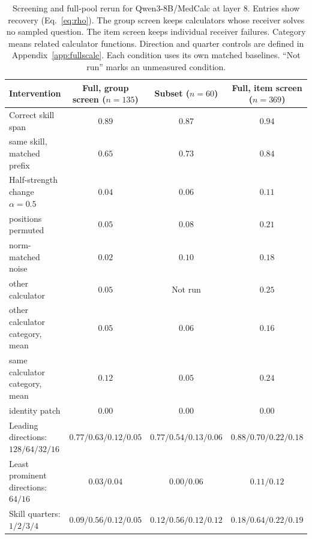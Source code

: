 \begin{table}[tbp]
\caption{Screening and full-pool rerun for Qwen3-8B/MedCalc at layer $8$.
Entries show recovery
(Eq.~\ref{eq:rho}). The group screen keeps calculators whose receiver
solves no sampled question. The item screen keeps individual receiver
failures. Category means related calculator functions. Direction and
quarter controls are defined in Appendix~\ref{app:fullscale}.
Each condition uses its own matched baselines. ``Not run'' marks an
unmeasured condition.}
\label{tab:fullscale}
\centering
\small
\renewcommand{\arraystretch}{1.18}
\begin{tabular}{lccc}
\toprule
Intervention & Full, group screen ($n=135$) & Subset ($n=60$) & Full, item screen ($n=369$) \\
\midrule
Correct skill span & $\mathbf{0.89}$ & $0.87$ & $0.94$ \\
same skill, matched prefix & $0.65$ & $0.73$ & $0.84$ \\
\midrule
Half-strength change $\alpha=0.5$ & $0.04$ & $0.06$ & $0.11$ \\
positions permuted & $0.05$ & $0.08$ & $0.21$ \\
norm-matched noise & $0.02$ & $0.10$ & $0.18$ \\
other calculator & $0.05$ & Not run & $0.25$ \\
other calculator category, mean & $0.05$ & $0.06$ & $0.16$ \\
same calculator category, mean & $0.12$ & $0.05$ & $0.24$ \\
identity patch & $0.00$ & $0.00$ & $0.00$ \\
\midrule
Leading directions: $128/64/32/16$ & $0.77/0.63/0.12/0.05$ & $0.77/0.54/0.13/0.06$ & $0.88/0.70/0.22/0.18$ \\
Least prominent directions: $64/16$ & $0.03/0.04$ & $0.00/0.06$ & $0.11/0.12$ \\
Skill quarters: $1/2/3/4$ & $0.09/\mathbf{0.56}/0.12/0.05$ & $0.12/0.56/0.12/0.12$ & $0.18/0.64/0.22/0.19$ \\
\bottomrule
\end{tabular}
\end{table}
